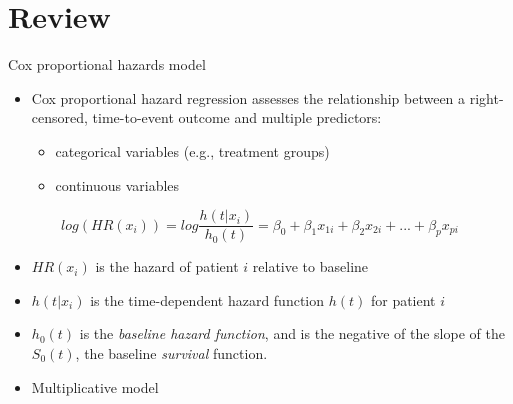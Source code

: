 \documentclass[
  ignorenonframetext,
]{beamer}
\providecommand{\tightlist}{%
  \setlength{\itemsep}{0pt}\setlength{\parskip}{0pt}}
\begin{document}
\hypertarget{review}{%
\section{Review}\label{review}}

\begin{frame}{Cox proportional hazards model}
\protect\hypertarget{cox-proportional-hazards-model}{}

\begin{itemize}
\tightlist
\item
  Cox proportional hazard regression assesses the relationship between a
  right-censored, time-to-event outcome and multiple predictors:

  \begin{itemize}
  \tightlist
  \item
    categorical variables (e.g., treatment groups)
  \item
    continuous variables
  \end{itemize}
\end{itemize}

\[
log(HR(x_i)) = log \frac{h(t|x_i)}{h_0(t)} = \beta_0 + \beta_1 x_{1i} + \beta_2 x_{2i} + ... + \beta_p x_{pi}
\]

\begin{itemize}
\item
  \(HR(x_i)\) is the hazard of patient \(i\) relative to baseline
\item
  \(h(t|x_i)\) is the time-dependent hazard function \(h(t)\) for
  patient \(i\)
\item
  \(h_0(t)\) is the \emph{baseline hazard function}, and is the negative
  of the slope of the \(S_0(t)\), the baseline \emph{survival} function.
\item
  Multiplicative model
\end{itemize}

\end{frame}
\end{document}
